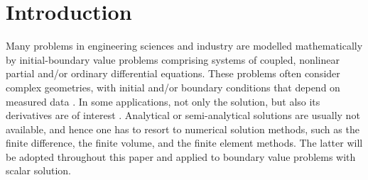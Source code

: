 \documentclass[final,3p]{elsarticle}
\begin{document}
\section{Introduction}

Many problems in engineering sciences and industry are modelled mathematically by initial-boundary value problems comprising systems of coupled, nonlinear partial and/or ordinary differential equations. These problems often consider complex geometries, with initial and/or boundary conditions that depend on measured data \citep{Kumar2016}. 
In some applications, not only the solution, but also its derivatives are of interest \citep{Kumar2016,carey1982derivative}.
Analytical or semi-analytical solutions are usually not available, and hence one has to resort to numerical solution methods, such as the finite difference, the finite volume, and the finite element method\textcolor{black}{s}. The latter will be adopted throughout this paper and applied to boundary value problems with scalar solution.


\end{document}
